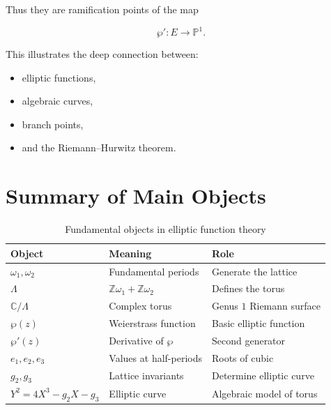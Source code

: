 \documentclass[12pt,a4paper]{article}
\theoremstyle{notespace}
\begin{document}
Thus they are ramification points of the map

\[
\wp':E\to\mathbb P^1.
\]

This illustrates the deep connection between:

\begin{itemize}
	\item elliptic functions,
	\item algebraic curves,
	\item branch points,
	\item and the Riemann--Hurwitz theorem.
\end{itemize}

\section{Summary of Main Objects}

\begin{table}[h]
	\centering
	\begin{tabular}{|l|l|l|}
		\hline
		Object & Meaning & Role \\ \hline
		
		\(\omega_1,\omega_2\)
		&
		Fundamental periods
		&
		Generate the lattice
		\\ \hline
		
		\(\Lambda\)
		&
		\(\mathbb Z\omega_1+\mathbb Z\omega_2\)
		&
		Defines the torus
		\\ \hline
		
		\(\mathbb C/\Lambda\)
		&
		Complex torus
		&
		Genus \(1\) Riemann surface
		\\ \hline
		
		\(\wp(z)\)
		&
		Weierstrass function
		&
		Basic elliptic function
		\\ \hline
		
		\(\wp'(z)\)
		&
		Derivative of \(\wp\)
		&
		Second generator
		\\ \hline
		
		\(e_1,e_2,e_3\)
		&
		Values at half-periods
		&
		Roots of cubic
		\\ \hline
		
		\(g_2,g_3\)
		&
		Lattice invariants
		&
		Determine elliptic curve
		\\ \hline
		
		\(Y^2=4X^3-g_2X-g_3\)
		&
		Elliptic curve
		&
		Algebraic model of torus
		\\ \hline
		
	\end{tabular}
	\caption{Fundamental objects in elliptic function theory}
\end{table}
\end{document}
